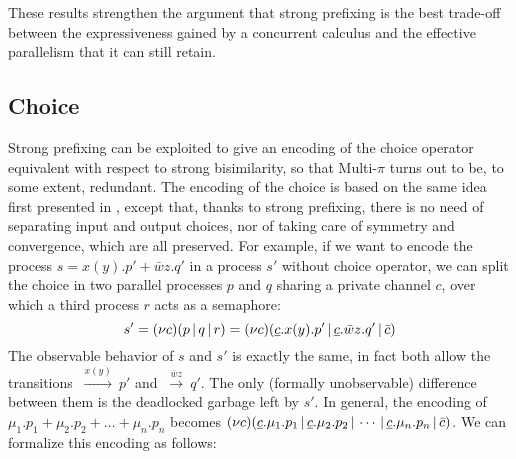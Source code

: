 \documentclass[submission,copyright,creativecommons]{eptcs}
\newcommand{\deriv}[1]{{\mbox{${\:\stackrel{#1}{\longrightarrow}\:}$}}}
\newcommand{\restr}[1]{\mbox{$({\bf\nu} #1)$}}
\newcommand{\para}{\mbox{$\,|\,$}}
\begin{document}
These results strengthen the argument that strong prefixing is the best trade-off
between the expressiveness gained by a concurrent calculus and the effective parallelism that it can still retain.

\subsection{Choice}
Strong prefixing can be exploited to give an encoding of the choice operator equivalent with respect to strong bisimilarity, so that Multi-$\pi$ turns out to be,
to some extent, redundant. The encoding of the choice is based on the same idea first presented in \cite{NP96}, except that,
thanks to strong prefixing, there is no need of separating input and output choices, nor of taking care of symmetry and convergence, which
are all preserved. For example, if we want to
encode the process $s = x(y).p' + \bar{w}z.q'$ in a process $s'$ without choice operator, 
we can split the choice in two parallel processes $p$ and $q$ sharing a private channel $c$, over which a third 
process $r$ acts as a semaphore:
\[ s' = \restr{c} ( p \para q \para r ) = \restr{c} ( \underline{c}.x(y).p' \para \underline{c}.\bar{w}z.q' \para \bar{c} ) \]
The observable behavior of $s$ and $s'$ is exactly the same, in fact both allow the transitions $\deriv{x(y)}p'$ and 
$\deriv{\bar{w}z}q'$. The only (formally unobservable) difference between them is the deadlocked garbage left by $s'$.
In general, the encoding of $\mu_1.p_1 + \mu_2.p_2 + \ldots + \mu_n.p_n$ becomes
$ \restr{c} ( \underline{c}.\mu_1.p_1 \para \underline{c}.\mu_2.p_2 \para \cdots \para \underline{c}.\mu_n.p_n \para \bar{c} )$. We can formalize this encoding as follows:
\end{document}
